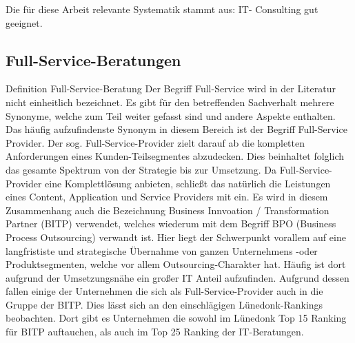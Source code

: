 Die für diese Arbeit relevante Systematik stammt aus: \cite[56]{Lippold201309}
IT- Consulting gut geeignet.

\subsection{Full-Service-Beratungen}
Definition Full-Service-Beratung
Der Begriff Full-Service wird in der Literatur nicht einheitlich bezeichnet. Es gibt für den betreffenden Sachverhalt mehrere Synonyme, welche zum Teil weiter gefasst sind und andere Aspekte enthalten. Das häufig aufzufindenste Synonym in diesem Bereich ist der Begriff Full-Service Provider.
Der sog. \glqq Full-Service-Provider \grqq zielt darauf ab die kompletten Anforderungen eines Kunden-Teilsegmentes abzudecken. \cite[124]{WeillVitale200106} Dies beinhaltet folglich das gesamte Spektrum von der Strategie bis zur Umsetzung. Da Full-Service-Provider eine Komplettlösung anbieten, schließt das natürlich die Leistungen eines Content, Application und Service Providers mit ein. \cite[83]{Thalmann200708}
Es wird in diesem Zusammenhang auch die Bezeichnung Business Innvoation / Transformation Partner (BITP) verwendet, welches wiederum mit dem Begriff BPO (Business Process Outsourcing) verwandt ist. Hier liegt der Schwerpunkt vorallem auf eine langfrististe und strategische Übernahme von ganzen Unternehmens -oder Produktsegmenten, welche vor allem Outsourcing-Charakter hat.\cite[163]{Pohland200908} Häufig ist dort aufgrund der Umsetzungsnähe ein großer IT Anteil aufzufinden. Aufgrund dessen fallen einige der Unternehmen die sich als Full-Service-Provider auch in die Gruppe der BITP. Dies lässt sich an den einschlägigen Lünedonk-Rankings beobachten. Dort gibt es Unternehmen die sowohl im Lünedonk Top 15 Ranking für BITP auftauchen, als auch im Top 25 Ranking der IT-Beratungen.\cite {topBITP} \cite {topITB}

